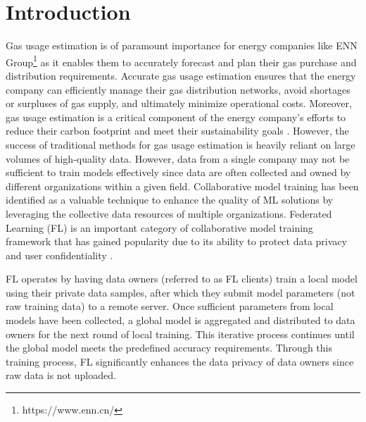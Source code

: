 \documentclass{article}
\begin{document}
\section{Introduction}
\label{sec:introduction}
\def\thefootnote{*}
Gas usage estimation is of paramount importance for energy companies like ENN Group\footnote{https://www.enn.cn/} as it enables them to accurately forecast and plan their gas purchase and distribution requirements. Accurate gas usage estimation ensures that the energy company can efficiently manage their gas distribution networks, avoid shortages or surpluses of gas supply, and ultimately minimize operational costs. Moreover, gas usage estimation is a critical component of the energy company's efforts to reduce their carbon footprint and meet their sustainability goals \cite{le2020temporary}. 
However, the success of traditional methods for gas usage estimation is heavily reliant on large volumes of high-quality data. However, data from a single company may not be sufficient to train models effectively since data are often collected and owned by different organizations within a given field. Collaborative model training \cite{warnat2021swarm,chen2023efficient} has been identified as a valuable technique to enhance the quality of ML solutions by leveraging the collective data resources of multiple organizations. Federated Learning (FL) is an important category of collaborative model training framework that has gained popularity due to its ability to protect data privacy and user confidentiality \cite{yang2019federated,Liu-et-al:2020FedVision,Liu-et-al:2022IAAI}.

FL operates by having data owners (referred to as FL clients) train a local model using their private data samples, after which they submit model parameters (not raw training data) to a remote server. Once sufficient parameters from local models have been collected, a global model is aggregated and distributed to data owners for the next round of local training. This iterative process continues until the global model meets the predefined accuracy requirements. Through this training process, FL significantly enhances the data privacy of data owners since raw data is not uploaded.
\end{document}
